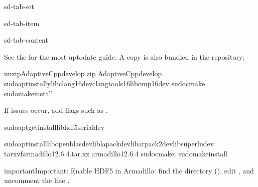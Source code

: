 \documentclass[a4paper,10pt,english]{sphinxmanual}
\begin{document}
\begin{sphinxuseclass}{sd-tab-set}
\begin{sphinxuseclass}{sd-tab-item}
\begin{sphinxuseclass}{sd-tab-content}
\sphinxAtStartPar
{}

\sphinxAtStartPar
See the 
for the most up\sphinxhyphen{}to\sphinxhyphen{}date guide. A copy is also bundled in the repository:

\begin{sphinxVerbatim}[commandchars=\\\{\}]
unzipAdaptiveCpp\PYGZhy{}develop.zip
AdaptiveCpp\PYGZhy{}develop
sudoaptinstall\PYGZhy{}ylibclang\PYGZhy{}16\PYGZhy{}devclang\PYGZhy{}tools\PYGZhy{}16libomp\PYGZhy{}16\PYGZhy{}dev
sudocmake.
sudomakeinstall
\end{sphinxVerbatim}

\sphinxAtStartPar
If issues occur, add flags such as .

\sphinxAtStartPar
{}

\begin{sphinxVerbatim}[commandchars=\\\{\}]
sudoapt\PYGZhy{}getinstalllibhdf5\PYGZhy{}serial\PYGZhy{}dev
\end{sphinxVerbatim}

\sphinxAtStartPar
{}

\begin{sphinxVerbatim}[commandchars=\\\{\}]
sudoaptinstalllibopenblas\PYGZhy{}devliblapack\PYGZhy{}devlibarpack2\PYGZhy{}devlibsuperlu\PYGZhy{}dev
tar\PYGZhy{}xvfarmadillo\PYGZhy{}12.6.4.tar.xz
armadillo\PYGZhy{}12.6.4
sudocmake.
sudomakeinstall
\end{sphinxVerbatim}

\begin{sphinxadmonition}{important}{Important:}
\sphinxAtStartPar
Enable HDF5 in Armadillo: find the  directory
(), edit ,
and uncomment the line .
\end{sphinxadmonition}


\end{sphinxuseclass}
\end{sphinxuseclass}
\end{sphinxuseclass}
\end{document}
